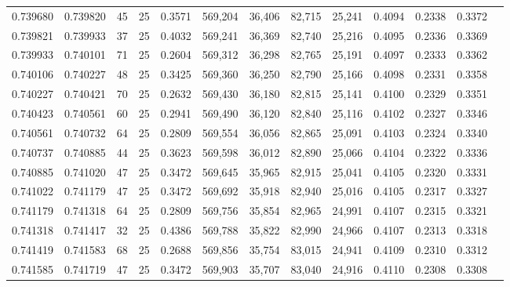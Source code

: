\begin{tabular}{rrrrrrrrrrrrr}
0.739680 & 0.739820 &    45 &  25 &                                     0.3571 & 569,204 &  36,406 &  82,715 &  25,241 & 0.4094 & 0.2338 & 0.3372 \\
0.739821 & 0.739933 &    37 &  25 &                                     0.4032 & 569,241 &  36,369 &  82,740 &  25,216 & 0.4095 & 0.2336 & 0.3369 \\
0.739933 & 0.740101 &    71 &  25 &                                     0.2604 & 569,312 &  36,298 &  82,765 &  25,191 & 0.4097 & 0.2333 & 0.3362 \\
0.740106 & 0.740227 &    48 &  25 &                                     0.3425 & 569,360 &  36,250 &  82,790 &  25,166 & 0.4098 & 0.2331 & 0.3358 \\
0.740227 & 0.740421 &    70 &  25 &                                     0.2632 & 569,430 &  36,180 &  82,815 &  25,141 & 0.4100 & 0.2329 & 0.3351 \\
0.740423 & 0.740561 &    60 &  25 &                                     0.2941 & 569,490 &  36,120 &  82,840 &  25,116 & 0.4102 & 0.2327 & 0.3346 \\
0.740561 & 0.740732 &    64 &  25 &                                     0.2809 & 569,554 &  36,056 &  82,865 &  25,091 & 0.4103 & 0.2324 & 0.3340 \\
0.740737 & 0.740885 &    44 &  25 &                                     0.3623 & 569,598 &  36,012 &  82,890 &  25,066 & 0.4104 & 0.2322 & 0.3336 \\
0.740885 & 0.741020 &    47 &  25 &                                     0.3472 & 569,645 &  35,965 &  82,915 &  25,041 & 0.4105 & 0.2320 & 0.3331 \\
0.741022 & 0.741179 &    47 &  25 &                                     0.3472 & 569,692 &  35,918 &  82,940 &  25,016 & 0.4105 & 0.2317 & 0.3327 \\
0.741179 & 0.741318 &    64 &  25 &                                     0.2809 & 569,756 &  35,854 &  82,965 &  24,991 & 0.4107 & 0.2315 & 0.3321 \\
0.741318 & 0.741417 &    32 &  25 &                                     0.4386 & 569,788 &  35,822 &  82,990 &  24,966 & 0.4107 & 0.2313 & 0.3318 \\
0.741419 & 0.741583 &    68 &  25 &                                     0.2688 & 569,856 &  35,754 &  83,015 &  24,941 & 0.4109 & 0.2310 & 0.3312 \\
0.741585 & 0.741719 &    47 &  25 &                                     0.3472 & 569,903 &  35,707 &  83,040 &  24,916 & 0.4110 & 0.2308 & 0.3308 \\

\end{tabular}
